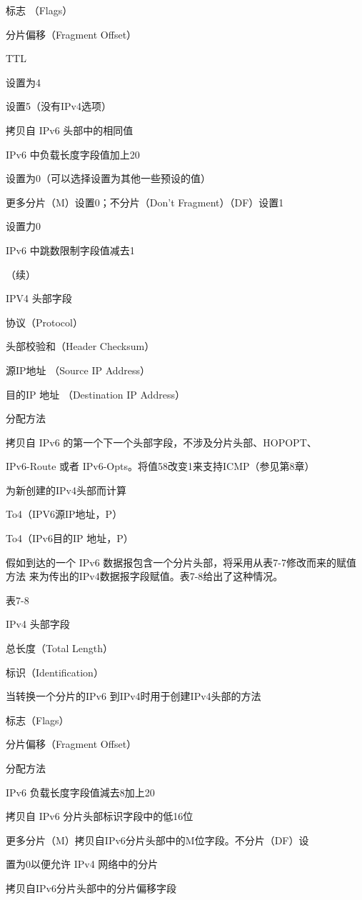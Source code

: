 标志 （Flags）

分片偏移（Fragment Offset）

TTL

设置为4

设置5（没有IPv4选项）

拷贝自 IPv6 头部中的相同值

IPv6 中负载长度字段值加上20

设置为0（可以选择设置为其他一些预设的值）

更多分片（M）设置0；不分片（Don't Fragment）（DF）设置1

设置力0

IPv6 中跳数限制字段值减去1

（续）

IPV4 头部字段

协议（Protocol）

头部校验和（Header Checksum）

源IP地址 （Source IP Address）

目的IP 地址 （Destination IP Address）

分配方法

拷贝自 IPv6 的第一个下一个头部字段，不涉及分片头部、HOPOPT、

IPv6-Route 或者 IPv6-Opts。将值58改变1来支持ICMP（参见第8章）

为新创建的IPv4头部而计算

To4（IPV6源IP地址，P）

To4（IPv6目的IP 地址，P）

假如到达的一个 IPv6 数据报包含一个分片头部，将采用从表7-7修改而来的赋值方法
来为传出的IPv4数据报字段赋值。表7-8给出了这种情况。

表7-8

IPv4 头部字段

总长度（Total Length）

标识（Identification）

当转换一个分片的IPv6 到IPv4时用于创建IPv4头部的方法

标志（Flags）

分片偏移（Fragment Offset）

分配方法

IPv6 负载长度字段值減去8加上20

拷贝自 IPv6 分片头部标识字段中的低16位

更多分片（M）拷贝自IPv6分片头部中的M位字段。不分片（DF）设

置为0以便允许 IPv4 网络中的分片

拷贝自IPv6分片头部中的分片偏移字段

